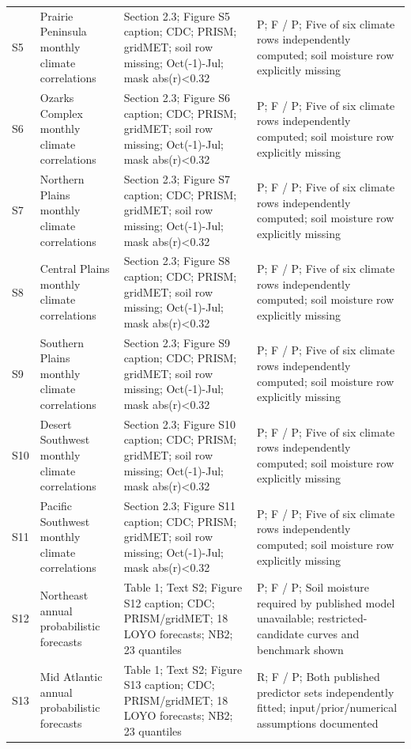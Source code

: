 \documentclass[11pt]{article}
\begin{document}
\begin{longtable}{p{}p{}p{}p{}}
S5 & Prairie Peninsula monthly climate correlations & Section 2.3; Figure S5 caption; CDC; PRISM; gridMET; soil row missing; Oct(-1)-Jul; mask abs(r)<0.32 & P; F / P; Five of six climate rows independently computed; soil moisture row explicitly missing \\
S6 & Ozarks Complex monthly climate correlations & Section 2.3; Figure S6 caption; CDC; PRISM; gridMET; soil row missing; Oct(-1)-Jul; mask abs(r)<0.32 & P; F / P; Five of six climate rows independently computed; soil moisture row explicitly missing \\
S7 & Northern Plains monthly climate correlations & Section 2.3; Figure S7 caption; CDC; PRISM; gridMET; soil row missing; Oct(-1)-Jul; mask abs(r)<0.32 & P; F / P; Five of six climate rows independently computed; soil moisture row explicitly missing \\
S8 & Central Plains monthly climate correlations & Section 2.3; Figure S8 caption; CDC; PRISM; gridMET; soil row missing; Oct(-1)-Jul; mask abs(r)<0.32 & P; F / P; Five of six climate rows independently computed; soil moisture row explicitly missing \\
S9 & Southern Plains monthly climate correlations & Section 2.3; Figure S9 caption; CDC; PRISM; gridMET; soil row missing; Oct(-1)-Jul; mask abs(r)<0.32 & P; F / P; Five of six climate rows independently computed; soil moisture row explicitly missing \\
S10 & Desert Southwest monthly climate correlations & Section 2.3; Figure S10 caption; CDC; PRISM; gridMET; soil row missing; Oct(-1)-Jul; mask abs(r)<0.32 & P; F / P; Five of six climate rows independently computed; soil moisture row explicitly missing \\
S11 & Pacific Southwest monthly climate correlations & Section 2.3; Figure S11 caption; CDC; PRISM; gridMET; soil row missing; Oct(-1)-Jul; mask abs(r)<0.32 & P; F / P; Five of six climate rows independently computed; soil moisture row explicitly missing \\
S12 & Northeast annual probabilistic forecasts & Table 1; Text S2; Figure S12 caption; CDC; PRISM/gridMET; 18 LOYO forecasts; NB2; 23 quantiles & P; F / P; Soil moisture required by published model unavailable; restricted-candidate curves and benchmark shown \\
S13 & Mid Atlantic annual probabilistic forecasts & Table 1; Text S2; Figure S13 caption; CDC; PRISM/gridMET; 18 LOYO forecasts; NB2; 23 quantiles & R; F / P; Both published predictor sets independently fitted; input/prior/numerical assumptions documented \\

\end{longtable}
\end{document}
